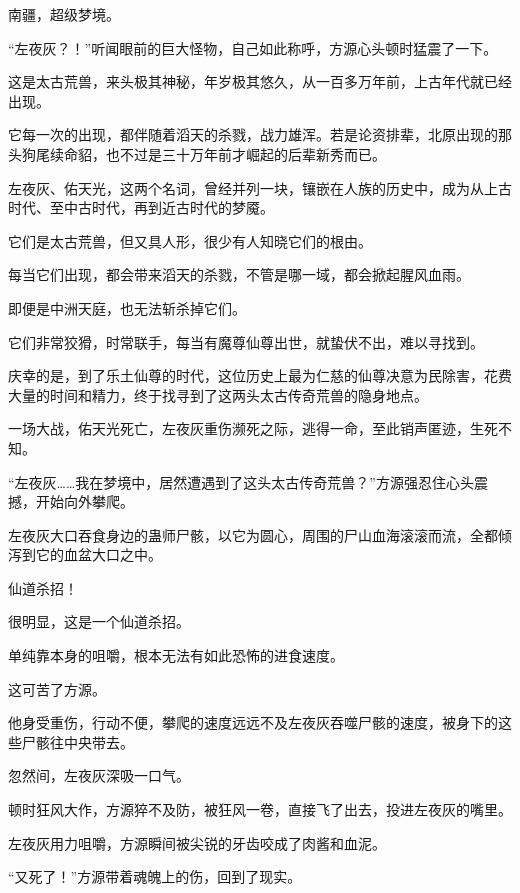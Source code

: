 
\begin{this_body}



南疆，超级梦境。

“左夜灰？！”听闻眼前的巨大怪物，自己如此称呼，方源心头顿时猛震了一下。

这是太古荒兽，来头极其神秘，年岁极其悠久，从一百多万年前，上古年代就已经出现。

它每一次的出现，都伴随着滔天的杀戮，战力雄浑。若是论资排辈，北原出现的那头狗尾续命貂，也不过是三十万年前才崛起的后辈新秀而已。

左夜灰、佑天光，这两个名词，曾经并列一块，镶嵌在人族的历史中，成为从上古时代、至中古时代，再到近古时代的梦魇。

它们是太古荒兽，但又具人形，很少有人知晓它们的根由。

每当它们出现，都会带来滔天的杀戮，不管是哪一域，都会掀起腥风血雨。

即便是中洲天庭，也无法斩杀掉它们。

它们非常狡猾，时常联手，每当有魔尊仙尊出世，就蛰伏不出，难以寻找到。

庆幸的是，到了乐土仙尊的时代，这位历史上最为仁慈的仙尊决意为民除害，花费大量的时间和精力，终于找寻到了这两头太古传奇荒兽的隐身地点。

一场大战，佑天光死亡，左夜灰重伤濒死之际，逃得一命，至此销声匿迹，生死不知。

“左夜灰……我在梦境中，居然遭遇到了这头太古传奇荒兽？”方源强忍住心头震撼，开始向外攀爬。

左夜灰大口吞食身边的蛊师尸骸，以它为圆心，周围的尸山血海滚滚而流，全都倾泻到它的血盆大口之中。

仙道杀招！

很明显，这是一个仙道杀招。

单纯靠本身的咀嚼，根本无法有如此恐怖的进食速度。

这可苦了方源。

他身受重伤，行动不便，攀爬的速度远远不及左夜灰吞噬尸骸的速度，被身下的这些尸骸往中央带去。

忽然间，左夜灰深吸一口气。

顿时狂风大作，方源猝不及防，被狂风一卷，直接飞了出去，投进左夜灰的嘴里。

左夜灰用力咀嚼，方源瞬间被尖锐的牙齿咬成了肉酱和血泥。

“又死了！”方源带着魂魄上的伤，回到了现实。


\end{this_body}
